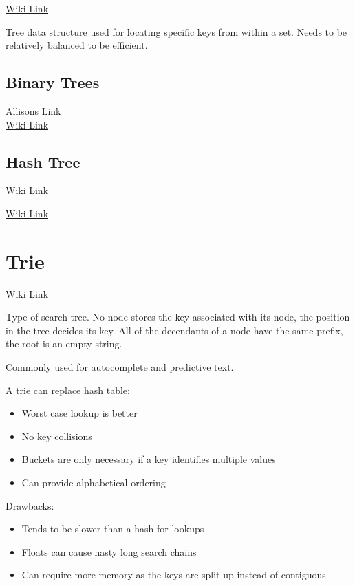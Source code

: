 \documentclass{notes}
\begin{document}
\href{https://en.wikipedia.org/wiki/Search_tree}{Wiki Link}

Tree data structure used for locating specific keys from within a set. Needs to be relatively balanced to be efficient.

\subsection{Binary Trees}

\href{http://www.allisons.org/ll/AlgDS/Tree/}{Allisons Link}\\
\href{https://en.wikipedia.org/wiki/Binary_tree}{Wiki Link}


\subsection{Hash Tree}

\href{https://en.wikipedia.org/wiki/Hashed_array_tree}{Wiki Link}

\href{https://en.wikipedia.org/wiki/Merkle_tree}{Wiki Link}

\section{Trie}

\href{https://en.wikipedia.org/wiki/Trie}{Wiki Link}

Type of search tree. No node stores the key associated with its node, the position in the tree decides its key. All of the decendants of a node have the same prefix, the root is an empty string.

Commonly used for autocomplete and predictive text. 

A trie can replace hash table:
\begin{itemize}
	\item Worst case lookup is better
	\item No key collisions
	\item Buckets are only necessary if a key identifies multiple values
	\item Can provide alphabetical ordering
\end{itemize}

Drawbacks:
\begin{itemize}
	\item Tends to be slower than a hash for lookups
	\item Floats can cause nasty long search chains
	\item Can require more memory as the keys are split up instead of contiguous
\end{itemize}
\end{document}
